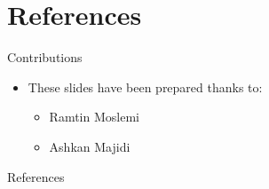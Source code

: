 \section{References}

\begin{frame}{Contributions}
    \begin{itemize}
        \item These slides have been prepared thanks to: 
	    \begin{itemize}
	        \item Ramtin Moslemi
            \item Ashkan Majidi
	    \end{itemize}
    \end{itemize}
\end{frame}


\begin{frame}{References}
    
    
    \nocite{*}
\end{frame}